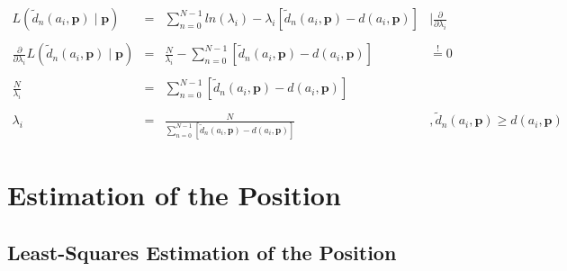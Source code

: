 \documentclass{article}
\begin{document}
\begin{itemize}
            	         
	     $\begin{array}{cccl}
	         L(\tilde{d}_n(a_i,\mathbf{p}) \mid \mathbf{p}) & = & \displaystyle \sum_{n=0}^{N-1} ln(\lambda_i) - \lambda_i [\tilde{d}_n(a_i,\mathbf{p}) - d(a_i,\mathbf{p})] & \mid \frac{\partial}{\partial\lambda_i} \\\\
	         \frac{\partial}{\partial\lambda_i} L(\tilde{d}_n(a_i,\mathbf{p}) \mid \mathbf{p}) & = & \frac{N}{\lambda_i} - \displaystyle \sum_{n=0}^{N-1}[\tilde{d}_n(a_i,\mathbf{p}) - d(a_i,\mathbf{p})] & \stackrel{!}{=} 0 \\\\
	         \frac{N}{\lambda_i} & = & \displaystyle \sum_{n=0}^{N-1} [\tilde{d}_n(a_i,\mathbf{p}) - d(a_i,\mathbf{p})] & \\\\
	         \lambda_i & = & \frac{N}{\displaystyle \sum_{n=0}^{N-1} [\tilde{d}_n(a_i,\mathbf{p}) - d(a_i,\mathbf{p})]} & ,\tilde{d}_n(a_i,\mathbf{p}) \geq d(a_i,\mathbf{p})
	     \end{array}$\\
	 
\end{itemize}


\section{Estimation of the Position}
\subsection{Least-Squares Estimation of the Position}
\end{document}
